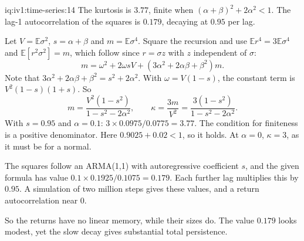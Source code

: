 \begin{solution}{iq:iv1:time-series:14}
The kurtosis is $3.77$, finite when $(\alpha + \beta)^2 + 2\alpha^2 < 1$. The lag-1 autocorrelation of the squares is $0.179$, decaying at $0.95$ per lag.

Let $V = \mathbb{E}\sigma^2$, $s = \alpha + \beta$ and $m = \mathbb{E}\sigma^4$. Square the recursion and use $\mathbb{E}r^4 = 3\mathbb{E}\sigma^4$ and $\mathbb{E}[r^2\sigma^2] = m$, which follow since $r = \sigma z$ with $z$ independent of $\sigma$:
\[
m = \omega^2 + 2\omega sV + (3\alpha^2 + 2\alpha\beta + \beta^2)m.
\]
Note that $3\alpha^2 + 2\alpha\beta + \beta^2 = s^2 + 2\alpha^2$. With $\omega = V(1 - s)$, the constant term is $V^2(1 - s)(1 + s)$. So
\[
m = \frac{V^2(1 - s^2)}{1 - s^2 - 2\alpha^2}, \qquad \kappa = \frac{3m}{V^2} = \frac{3(1 - s^2)}{1 - s^2 - 2\alpha^2}.
\]
With $s = 0.95$ and $\alpha = 0.1$: $3 \times 0.0975/0.0775 = 3.77$. The condition for finiteness is a positive denominator. Here $0.9025 + 0.02 < 1$, so it holds. At $\alpha = 0$, $\kappa = 3$, as it must be for a normal.

The squares follow an ARMA(1,1) with autoregressive coefficient $s$, and the given formula has value $0.1 \times 0.1925/0.1075 = 0.179$. Each further lag multiplies this by $0.95$. A simulation of two million steps gives these values, and a return autocorrelation near 0.

So the returns have no linear memory, while their sizes do. The value $0.179$ looks modest, yet the slow decay gives substantial total persistence.



\end{solution}

